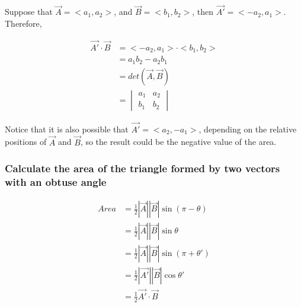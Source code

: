 \documentclass{article}
\begin{document}
Suppose that $\vec{A} = <a_1, a_2>$, and $\vec{B} = <b_1, b_2>$, then
$\vec{A'} = <-a_2, a_1>$. Therefore,

\[
  \begin{split}
  \vec{A'} \cdot \vec{B}  &= <-a_2, a_1> \cdot <b_1, b_2> \\
                          &= a_1 b_2 - a_2 b_1 \\
                          &= det(\vec{A}, \vec{B}) \\
                          &=  \begin{vmatrix}
                                a_1 & a_2 \\
                                b_1 & b_2
                              \end{vmatrix}
  \end{split}
\]

Notice that it is also possible that $\vec{A'} = <a_2, -a_1>$, depending on 
the relative positions of $\vec{A}$ and $\vec{B}$, so the result could be the
negative value of the area.

\subsubsection{Calculate the area of the triangle formed by two vectors with an obtuse angle}


\[
  \begin{split}
  Area  &= \frac{1}{2} |\vec{A}| |\vec{B}| \sin(\pi - \theta) \\
        &= \frac{1}{2} |\vec{A}| |\vec{B}| \sin\theta \\
        &= \frac{1}{2} |\vec{A}| |\vec{B}| \sin(\pi + \theta') \\
        &= \frac{1}{2} |\vec{A'}| |\vec{B}| \cos\theta' \\
        &= \frac{1}{2} \vec{A'} \cdot \vec{B}
  \end{split}
\]
\end{document}
